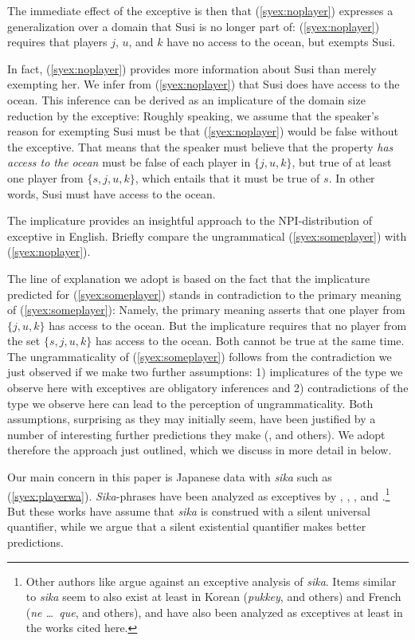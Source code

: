 \documentclass[output=paper]{langscibook}
\begin{document}
The immediate effect of the exceptive is then that (\ref{syex:noplayer}) expresses a generalization over a domain that Susi is no longer part of:
(\ref{syex:noplayer}) requires that players $j$, $u$, and $k$ have no access to the ocean, but exempts Susi.

In fact, (\ref{syex:noplayer}) provides more information about Susi than merely exempting her. We infer from (\ref{syex:noplayer}) that  Susi does have access to the ocean. This inference can be derived as an implicature of the domain size reduction by the exceptive: Roughly speaking, we assume that the speaker's reason for exempting Susi must be that (\ref{syex:noplayer}) would be false without the exceptive.  That means that the speaker must believe that the property \emph{has access to the ocean} must be false of each player in $\{j, u, k\}$, but true of at least one player from $\{s, j, u, k\}$, which entails that it must be true of $s$. In other words, Susi must have access to the ocean.

The implicature provides an insightful approach to the NPI-distribution of exceptive in English.  Briefly compare the ungrammatical (\ref{syex:someplayer}) with (\ref{syex:noplayer}).  

\z

The line of explanation we adopt is based on the fact that the implicature predicted for (\ref{syex:someplayer}) stands in contradiction to the primary meaning of (\ref{syex:someplayer}): Namely, the primary meaning asserts that one player from $\{j, u, k\}$ has access to the ocean.  But the implicature requires that no player from the set $\{s, j, u, k\}$ has access to the ocean. Both cannot be true at the same time.  The ungrammaticality of (\ref{syex:someplayer}) follows from the contradiction we just observed if we make two further assumptions: 1) implicatures of the type we observe here with exceptives are obligatory inferences and 2) contradictions of the type we observe here can lead to the perception of ungrammaticality.  Both assumptions, surprising as they may initially seem, have been justified by a number of interesting further predictions they make (\citealt{chierchia13a}, and others).  We adopt therefore the approach just outlined, which we discuss in more detail in  below.

Our main concern in this paper is Japanese data with \emph{sika} such as (\ref{syex:playerwa}).
\emph{Sika}-phrases have been analyzed as exceptives by \citet{alonso-ovalle04a}, \citet{yoshimura2007b}, \citet{kawahara08a}, and \citet{shimoyama11}.\footnote{Other authors like \citet{hasegawa11a} argue against an exceptive analysis of \emph{sika}. Items similar to \emph{sika} seem to also exist at least in Korean (\emph{pukkey}, \citealt{sells01a} and others) and French (\emph{ne \dots\ que}, \citealt{fintel07a} and others), and have also been analyzed as exceptives at least in the works cited here.}  But these works have assume that \emph{sika} is construed with a silent universal quantifier, while we argue that a silent existential quantifier makes better predictions.
\end{document}
